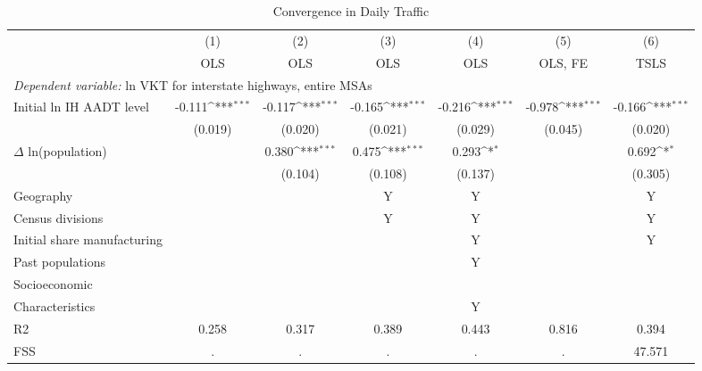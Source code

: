          \begin{table}[htbp]\centering         {}         \caption{Convergence in Daily Traffic}         \begin{tabular}{l*{6}{c}}         \hline\hline                 
                    &\multicolumn{1}{c}{(1)}&\multicolumn{1}{c}{(2)}&\multicolumn{1}{c}{(3)}&\multicolumn{1}{c}{(4)}&\multicolumn{1}{c}{(5)}&\multicolumn{1}{c}{(6)}\\
                    &\multicolumn{1}{c}{OLS}&\multicolumn{1}{c}{OLS}&\multicolumn{1}{c}{OLS}&\multicolumn{1}{c}{OLS}&\multicolumn{1}{c}{OLS, FE}&\multicolumn{1}{c}{TSLS}\\
 \hline \multicolumn{6}{l}{ \emph{Dependent variable:} ln VKT for interstate highways, entire MSAs} \\ 
Initial ln IH AADT level&      -0.111\sym{***}&      -0.117\sym{***}&      -0.165\sym{***}&      -0.216\sym{***}&      -0.978\sym{***}&      -0.166\sym{***}\\
                    &     (0.019)         &     (0.020)         &     (0.021)         &     (0.029)         &     (0.045)         &     (0.020)         \\
[1em]
$\Delta$ ln(population)&                     &       0.380\sym{***}&       0.475\sym{***}&       0.293\sym{*}  &                     &       0.692\sym{*}  \\
                    &                     &     (0.104)         &     (0.108)         &     (0.137)         &                     &     (0.305)         \\
           Geography & & & Y & Y & & Y \\            Census divisions & & & Y & Y & & Y \\           Initial share manufacturing & & & & Y & & Y \\           Past populations & & & & Y & & \\           Socioeconomic           \\Characteristics & & & & Y & &  \\                  
R2                  &       0.258         &       0.317         &       0.389         &       0.443         &       0.816         &       0.394         \\
FSS                 &           .         &           .         &           .         &           .         &           .         &      47.571         \\
\hline\hline
\end{tabular}

\end{table}
